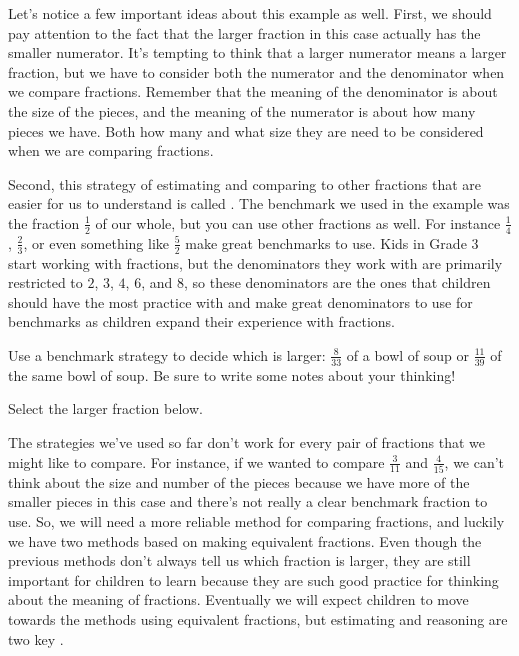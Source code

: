 \documentclass{ximera}
\begin{document}
Let's notice a few important ideas about this example as well. First, we should pay attention to the fact that the larger fraction in this case actually has the smaller numerator. It's tempting to think that a larger numerator means a larger fraction, but we have to consider both the numerator and the denominator when we compare fractions. Remember that the meaning of the denominator is about the size of the pieces, and the meaning of the numerator is about how many pieces we have. Both how many and what size they are need to be considered when we are comparing fractions.

Second, this strategy of estimating and comparing to other fractions that are easier for us to understand is called . The benchmark we used in the example was the fraction $\frac{1}{2}$ of our whole, but you can use other fractions as well. For instance $\frac{1}{4}$, $\frac{2}{3}$, or even something like $\frac{5}{2}$ make great benchmarks to use. Kids in Grade 3 start working with fractions, but the denominators they work with are primarily restricted to $2$, $3$, $4$, $6$, and $8$,  so these denominators are the ones that children should have the most practice with and make great denominators to use for benchmarks as children expand their experience with fractions.

\begin{question}
Use a benchmark strategy to decide which is larger: $\frac{8}{33}$ of a bowl of soup or $\frac{11}{39}$ of the same bowl of soup. Be sure to write some notes about your thinking!

Select the larger fraction below.
\begin{multipleChoice}
\end{multipleChoice}
\end{question}

The strategies we've used so far don't work for every pair of fractions that we might like to compare. For instance, if we wanted to compare $\frac{3}{11}$ and $\frac{4}{15}$, we can't think about the size and number of the pieces because we have more of the smaller pieces in this case and there's not really a clear benchmark fraction to use. So, we will need a more reliable method for comparing fractions, and luckily we have two methods based on making equivalent fractions. Even though the previous methods don't always tell us which fraction is larger, they are still important for children to learn because they are such good practice for thinking about the meaning of fractions. Eventually we will expect children to move towards the methods using equivalent fractions, but estimating and reasoning are two key .
\end{document}
